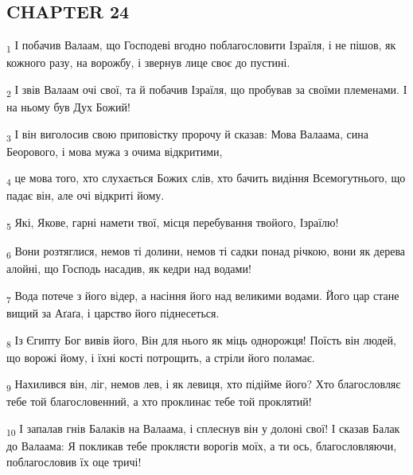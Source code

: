 \subsection{CHAPTER 24}
\begin{tcolorbox}
\textsubscript{1} І побачив Валаам, що Господеві вгодно поблагословити Ізраїля, і не пішов, як кожного разу, на ворожбу, і звернув лице своє до пустині.
\end{tcolorbox}
\begin{tcolorbox}
\textsubscript{2} І звів Валаам очі свої, та й побачив Ізраїля, що пробував за своїми племенами. І на ньому був Дух Божий!
\end{tcolorbox}
\begin{tcolorbox}
\textsubscript{3} І він виголосив свою приповістку пророчу й сказав: Мова Валаама, сина Беорового, і мова мужа з очима відкритими,
\end{tcolorbox}
\begin{tcolorbox}
\textsubscript{4} це мова того, хто слухається Божих слів, хто бачить видіння Всемогутнього, що падає він, але очі відкриті йому.
\end{tcolorbox}
\begin{tcolorbox}
\textsubscript{5} Які, Якове, гарні намети твої, місця перебування твойого, Ізраїлю!
\end{tcolorbox}
\begin{tcolorbox}
\textsubscript{6} Вони розтяглися, немов ті долини, немов ті садки понад річкою, вони як дерева алойні, що Господь насадив, як кедри над водами!
\end{tcolorbox}
\begin{tcolorbox}
\textsubscript{7} Вода потече з його відер, а насіння його над великими водами. Його цар стане вищий за Аґаґа, і царство його піднесеться.
\end{tcolorbox}
\begin{tcolorbox}
\textsubscript{8} Із Єгипту Бог вивів його, Він для нього як міць однорожця! Поїсть він людей, що ворожі йому, і їхні кості потрощить, а стріли його поламає.
\end{tcolorbox}
\begin{tcolorbox}
\textsubscript{9} Нахилився він, ліг, немов лев, і як левиця, хто підійме його? Хто благословляє тебе той благословенний, а хто проклинає тебе той проклятий!
\end{tcolorbox}
\begin{tcolorbox}
\textsubscript{10} І запалав гнів Балаків на Валаама, і сплеснув він у долоні свої! І сказав Балак до Валаама: Я покликав тебе проклясти ворогів моїх, а ти ось, благословляючи, поблагословив їх оце тричі!
\end{tcolorbox}
